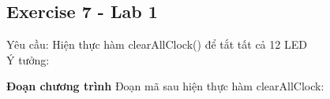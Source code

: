\subsection{Exercise 7 - Lab 1}
Yêu cầu: Hiện thực hàm clearAllClock() để tắt tất cả 12 LED\\
Ý tưởng:


\textbf{Đoạn chương trình}
Đoạn mã sau hiện thực hàm clearAllClock:

